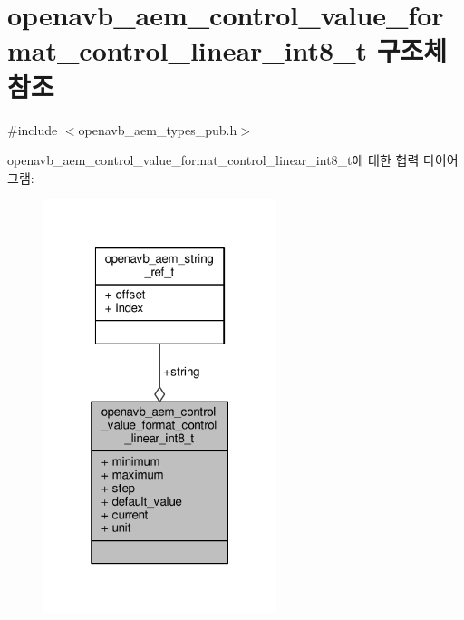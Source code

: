 \hypertarget{structopenavb__aem__control__value__format__control__linear__int8__t}{}\section{openavb\+\_\+aem\+\_\+control\+\_\+value\+\_\+format\+\_\+control\+\_\+linear\+\_\+int8\+\_\+t 구조체 참조}
\label{structopenavb__aem__control__value__format__control__linear__int8__t}


{\ttfamily \#include $<$openavb\+\_\+aem\+\_\+types\+\_\+pub.\+h$>$}



openavb\+\_\+aem\+\_\+control\+\_\+value\+\_\+format\+\_\+control\+\_\+linear\+\_\+int8\+\_\+t에 대한 협력 다이어그램\+:
\nopagebreak
\begin{figure}[H]
\begin{center}
\leavevmode
\includegraphics[width=193pt]{structopenavb__aem__control__value__format__control__linear__int8__t__coll__graph}
\end{center}
\end{figure}
